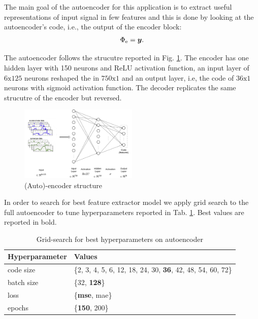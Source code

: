 The main goal of the autoencoder for this application is to extract
useful representations of input signal in few features and this is
done by looking at the autoencoder's code, i.e., the output of the
encoder block:
\begin{equation}
  \Phi_{\text{e}} = \boldsymbol{y}.
\end{equation}

The autoencoder follows the strucutre reported in
Fig. \ref{fig:encoder-structure}. The encoder has one hidden layer
with 150 neurons and ReLU activation function, an input layer of
$6\text{x}125$ neurons reshaped the in $750\text{x}1$ and an output
layer, i.e, the code of $36\text{x}1$ neurons with sigmoid activation
function. The decoder replicates the same strucutre of the encoder but
reversed.
\begin{figure}[h]
  \includegraphics[width=0.5\textwidth]{images/encoder.jpg}
  \caption{(Auto)-encoder structure}
  \label{fig:encoder-structure}
\end{figure}
In order to search for best feature extractor model we apply grid
search to the full autoencoder to tune hyperparameters reported in
Tab. \ref{tab:ae-hyperparams}. Best values are reported in bold.
\begin{table}
  \centering
  \begin{tabular}{lp{4cm}} 
    \hline
    Hyperparameter & Values \\ 
    \hline
    code size & \{2, 3, 4, 5, 6, 12, 18, 24, 30, \textbf{36}, 42, 48, 54, 60, 72\} \\
    batch size & \{32, \textbf{128}\} \\
    loss & \{\textbf{mse}, mae\} \\
    epochs & \{\textbf{150}, 200\} \\
    \hline
  \end{tabular}
  \caption{Grid-search for best hyperparameters on autoencoder}
  \label{tab:ae-hyperparams}
\end{table}

